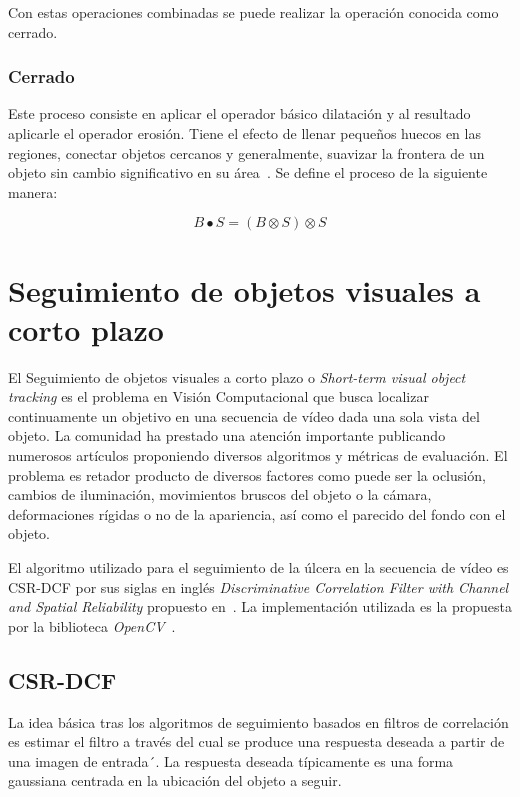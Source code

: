 Con estas operaciones combinadas se puede realizar la operación conocida como cerrado.

\subsubsection{Cerrado}

 Este proceso consiste en aplicar el operador básico dilatación y al resultado aplicarle el operador erosión. Tiene el efecto de llenar pequeños huecos en las regiones, conectar objetos cercanos y generalmente, suavizar la frontera de un objeto sin cambio significativo en su área~\cite{castleman1996digital}. Se define el proceso de la siguiente manera:

\begin{equation}
	B \bullet S = (B \otimes S) \otimes S
\end{equation}

\section{Seguimiento de objetos visuales a corto plazo}\label{section:tracking}

El Seguimiento de objetos visuales a corto plazo o \textit{Short-term visual object tracking} es el problema en Visión Computacional que busca localizar continuamente un objetivo en una secuencia de vídeo dada una sola vista del objeto. La comunidad ha prestado una atención importante publicando numerosos artículos proponiendo diversos algoritmos y métricas de evaluación. El problema es retador producto de diversos factores como puede ser la oclusión, cambios de iluminación, movimientos bruscos del objeto o la cámara, deformaciones rígidas o no de la apariencia, así como el parecido del fondo con el objeto.	

El algoritmo utilizado para el seguimiento de la úlcera en la secuencia de vídeo es CSR-DCF por sus siglas en inglés \textit{Discriminative Correlation Filter with Channel and Spatial Reliability} propuesto en~\cite{lunevzivc2018discriminative}. La implementación utilizada es la propuesta por la biblioteca \textit{OpenCV}~\cite{bradski2000opencv}.

\subsection{CSR-DCF}

La idea básica tras los algoritmos de seguimiento basados en filtros de correlación es estimar el filtro a través del cual se produce una respuesta deseada a partir de una imagen de entrada´. La respuesta deseada típicamente es una forma gaussiana centrada en la ubicación del objeto a seguir.

